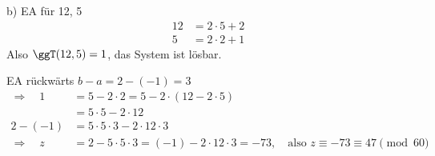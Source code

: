 \begin{loesung}
b) EA für 12, 5
\begin{align*}
12 &= 2 \cdot 5 + 2\\
5 &= 2 \cdot 2 + 1
\end{align*}
Also $\ggT(12, 5) = 1$, das System ist lösbar.

EA rückwärts \qquad $b - a = 2 - (-1) = 3$
\begin{align*}
\Rightarrow\quad 1 &= 5 - 2 \cdot 2 = 5 - 2 \cdot (12 - 2 \cdot 5)\\
&= 5 \cdot 5 - 2 \cdot 12\\
2 - (-1) &= 5 \cdot 5 \cdot 3 - 2 \cdot 12 \cdot 3\\
\Rightarrow\quad z &= 2 - 5 \cdot 5 \cdot 3 = (-1) - 2 \cdot 12 \cdot 3 = -73, \quad \text{also } z \equiv -73 \equiv 47 \pmod{60}
\end{align*}
\end{loesung}
